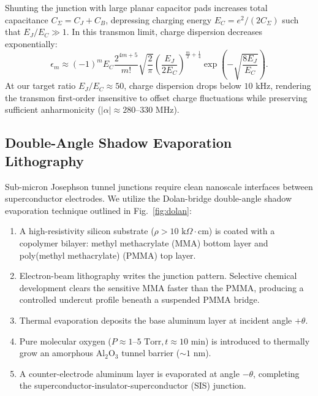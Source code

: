 \documentclass[10pt,journal,compsoc]{IEEEtran}
\begin{document}
Shunting the junction with large planar capacitor pads increases total capacitance $C_\Sigma = C_J + C_B$, depressing charging energy $E_C = e^2/(2C_\Sigma)$ such that $E_J/E_C \gg 1$. In this transmon limit, charge dispersion decreases exponentially:
\begin{equation}
\epsilon_m \approx (-1)^m E_C \frac{2^{4m+5}}{m!} \sqrt{\frac{2}{\pi}} \left(\frac{E_J}{2E_C}\right)^{\frac{m}{2} + \frac{1}{4}} \exp\left(-\sqrt{\frac{8 E_J}{E_C}}\right).
\end{equation}
At our target ratio $E_J / E_C \approx 50$, charge dispersion drops below $10\text{ kHz}$, rendering the transmon first-order insensitive to offset charge fluctuations while preserving sufficient anharmonicity ($|\alpha| \approx 280\text{--}330\text{ MHz}$).

\subsection{Double-Angle Shadow Evaporation Lithography}
Sub-micron Josephson tunnel junctions require clean nanoscale interfaces between superconductor electrodes. We utilize the Dolan-bridge double-angle shadow evaporation technique outlined in Fig.~\ref{fig:dolan}:
\begin{enumerate}
    \item A high-resistivity silicon substrate ($\rho > 10\text{ k}\Omega\cdot\text{cm}$) is coated with a copolymer bilayer: methyl methacrylate (MMA) bottom layer and poly(methyl methacrylate) (PMMA) top layer.
    \item Electron-beam lithography writes the junction pattern. Selective chemical development clears the sensitive MMA faster than the PMMA, producing a controlled undercut profile beneath a suspended PMMA bridge.
    \item Thermal evaporation deposits the base aluminum layer at incident angle $+\theta$.
    \item Pure molecular oxygen ($P \approx 1\text{--}5\text{ Torr}, t \approx 10\text{ min}$) is introduced to thermally grow an amorphous $\text{Al}_2\text{O}_3$ tunnel barrier ($\sim 1\text{ nm}$).
    \item A counter-electrode aluminum layer is evaporated at angle $-\theta$, completing the superconductor-insulator-superconductor (SIS) junction.
\end{enumerate}
\end{document}
